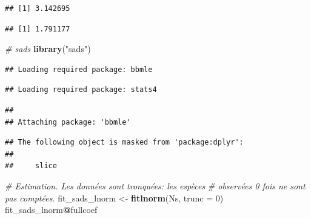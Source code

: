 \documentclass[
  11pt,
  french,
  a4paper,
  extrafontsizes,onecolumn,openright
  ]{memoir}
\newenvironment{Shaded}{\begin{snugshade}}{\end{snugshade}}
\newcommand{\CommentTok}[1]{\textcolor[rgb]{0.56,0.35,0.01}{\textit{#1}}}
\newcommand{\DataTypeTok}[1]{\textcolor[rgb]{0.13,0.29,0.53}{#1}}
\newcommand{\DecValTok}[1]{\textcolor[rgb]{0.00,0.00,0.81}{#1}}
\newcommand{\KeywordTok}[1]{\textcolor[rgb]{0.13,0.29,0.53}{\textbf{#1}}}
\newcommand{\NormalTok}[1]{#1}
\newcommand{\OperatorTok}[1]{\textcolor[rgb]{0.81,0.36,0.00}{\textbf{#1}}}
\newcommand{\StringTok}[1]{\textcolor[rgb]{0.31,0.60,0.02}{#1}}
\begin{document}
\scriptsize

\begin{Shaded}
\end{Shaded}

\begin{verbatim}
## [1] 3.142695
\end{verbatim}

\begin{Shaded}
\end{Shaded}

\begin{verbatim}
## [1] 1.791177
\end{verbatim}

\begin{Shaded}
\begin{Highlighting}[]
\CommentTok{# sads}
\KeywordTok{library}\NormalTok{(}\StringTok{"sads"}\NormalTok{)}
\end{Highlighting}
\end{Shaded}

\begin{verbatim}
## Loading required package: bbmle
\end{verbatim}

\begin{verbatim}
## Loading required package: stats4
\end{verbatim}

\begin{verbatim}
## 
## Attaching package: 'bbmle'
\end{verbatim}

\begin{verbatim}
## The following object is masked from 'package:dplyr':
## 
##     slice
\end{verbatim}

\begin{Shaded}
\begin{Highlighting}[]
\CommentTok{# Estimation. Les données sont tronquées: les espèces}
\CommentTok{# observées 0 fois ne sont pas comptées.}
\NormalTok{fit_sads_lnorm <-}\StringTok{ }\KeywordTok{fitlnorm}\NormalTok{(Ns, }\DataTypeTok{trunc =} \DecValTok{0}\NormalTok{)}
\NormalTok{fit_sads_lnorm}\OperatorTok{@}\NormalTok{fullcoef}
\end{Highlighting}
\end{Shaded}
\end{document}
